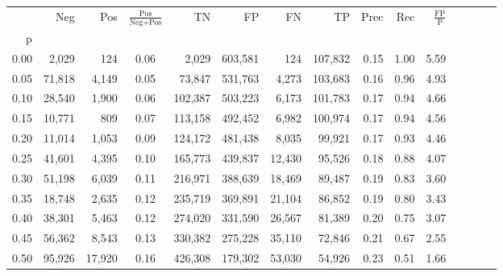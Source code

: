 \begin{tabular}{rrrcrrrrrrrrrrr}
\toprule
{} &     Neg &     Pos & $\frac{\text{Pos}}{\text{Neg}+\text{Pos}}$ &       TN &       FP &       FN &       TP &  Prec &   Rec & $\frac{\text{FP}}{\text{P}}$ \\
p    &         &         &                                            &          &          &          &          &       &       &                              \\
\midrule
0.00 &   2,029 &     124 &                                       0.06 &    2,029 &  603,581 &      124 &  107,832 &  0.15 &  1.00 &                         5.59 \\
0.05 &  71,818 &   4,149 &                                       0.05 &   73,847 &  531,763 &    4,273 &  103,683 &  0.16 &  0.96 &                         4.93 \\
0.10 &  28,540 &   1,900 &                                       0.06 &  102,387 &  503,223 &    6,173 &  101,783 &  0.17 &  0.94 &                         4.66 \\
0.15 &  10,771 &     809 &                                       0.07 &  113,158 &  492,452 &    6,982 &  100,974 &  0.17 &  0.94 &                         4.56 \\
0.20 &  11,014 &   1,053 &                                       0.09 &  124,172 &  481,438 &    8,035 &   99,921 &  0.17 &  0.93 &                         4.46 \\
0.25 &  41,601 &   4,395 &                                       0.10 &  165,773 &  439,837 &   12,430 &   95,526 &  0.18 &  0.88 &                         4.07 \\
0.30 &  51,198 &   6,039 &                                       0.11 &  216,971 &  388,639 &   18,469 &   89,487 &  0.19 &  0.83 &                         3.60 \\
0.35 &  18,748 &   2,635 &                                       0.12 &  235,719 &  369,891 &   21,104 &   86,852 &  0.19 &  0.80 &                         3.43 \\
0.40 &  38,301 &   5,463 &                                       0.12 &  274,020 &  331,590 &   26,567 &   81,389 &  0.20 &  0.75 &                         3.07 \\
0.45 &  56,362 &   8,543 &                                       0.13 &  330,382 &  275,228 &   35,110 &   72,846 &  0.21 &  0.67 &                         2.55 \\
0.50 &  95,926 &  17,920 &                                       0.16 &  426,308 &  179,302 &   53,030 &   54,926 &  0.23 &  0.51 &                         1.66 \\

\end{tabular}

